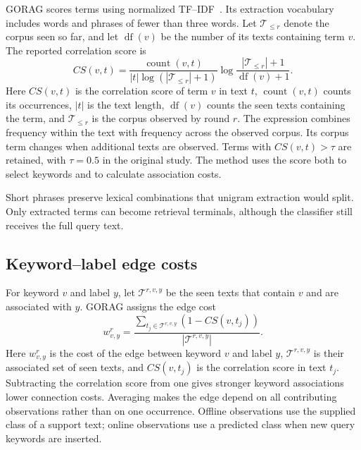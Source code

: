 GORAG scores terms using normalized TF--IDF~\cite{gorag-tfidf}. Its extraction vocabulary includes words and phrases of fewer than three words. Let $\mathcal{T}_{\leq r}$ denote the corpus seen so far, and let $\operatorname{df}(v)$ be the number of its texts containing term $v$. The reported correlation score is
\begin{equation}
CS(v,t)=\frac{\operatorname{count}(v,t)}{|t|\log(|\mathcal{T}_{\leq r}|+1)}
\log\frac{|\mathcal{T}_{\leq r}|+1}{\operatorname{df}(v)+1}.
\label{eq:gorag:correlation}
\end{equation}
Here $CS(v,t)$ is the correlation score of term $v$ in text $t$, $\operatorname{count}(v,t)$ counts its occurrences, $|t|$ is the text length, $\operatorname{df}(v)$ counts the seen texts containing the term, and $\mathcal T_{\leq r}$ is the corpus observed by round $r$. The expression combines frequency within the text with frequency across the observed corpus. Its corpus term changes when additional texts are observed. Terms with $CS(v,t)>\tau$ are retained, with $\tau=0.5$ in the original study. The method uses the score both to select keywords and to calculate association costs.

Short phrases preserve lexical combinations that unigram extraction would split. Only extracted terms can become retrieval terminals, although the classifier still receives the full query text.

\subsection{Keyword--label edge costs}
\label{sec:gorag:weights}

For keyword $v$ and label $y$, let $\mathcal{T}^{r,v,y}$ be the seen texts that contain $v$ and are associated with $y$. GORAG assigns the edge cost
\begin{equation}
w_{v,y}^r=\frac{\sum_{t_j\in\mathcal{T}^{r,v,y}}(1-CS(v,t_j))}{|\mathcal{T}^{r,v,y}|}.
\label{eq:gorag:weights}
\end{equation}
Here $w_{v,y}^r$ is the cost of the edge between keyword $v$ and label $y$, $\mathcal T^{r,v,y}$ is their associated set of seen texts, and $CS(v,t_j)$ is the correlation score in text $t_j$. Subtracting the correlation score from one gives stronger keyword associations lower connection costs. Averaging makes the edge depend on all contributing observations rather than on one occurrence. Offline observations use the supplied class of a support text; online observations use a predicted class when new query keywords are inserted.

